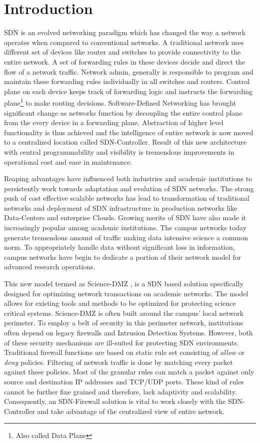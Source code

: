\section{Introduction}

SDN is an evolved networking paradigm which has changed the way a network operates when compared to conventional networks. A traditional network uses different set of devices like router and switches to provide connectivity to the entire network. A set of forwarding rules in these devices decide and direct the flow of a network traffic. Network admin, generally is responsible to program and maintain these forwarding 
rules individually in all switches and routers. Control plane on each device
keeps track of forwarding logic and instructs the forwarding plane\footnote
{Also called Data Plane} to make routing decisions. 
Software-Defined Networking has brought significant change as networks function by
decoupling the entire control plane from the every device in a forwarding plane. Abstraction of higher level functionality is thus achieved and the intelligence of entire 
network  is now moved to a centralized location called SDN-Controller. 
Result of this new architecture with central programmability and visibility is tremendous improvements in operational cost and ease in maintenance.

Reaping advantages have influenced both industries and academic institutions to  persistently work towards adaptation and evolution of SDN networks. The strong push of cost effective scalable networks has lead to transformation of traditional networks and deployment of SDN infrastructure in production networks like Data-Centers and enterprise Clouds. Growing merits of SDN have also made it increasingly popular among academic institutions. The campus networks today generate tremendous amount of traffic making data intensive science a common norm.
To appropriately handle data without significant loss in information, campus networks have begin to dedicate a portion of their network model for advanced research operations.

This new model termed as Science-DMZ \cite{SCIENCEDMZ}, is a SDN based solution specifically designed for optimizing network transactions on academic networks. The model allows for existing tools and methods to be optimized for protecting science critical systems.
Science-DMZ is often built around the campus' local network perimeter. To employ a belt of security in this perimeter network, institutions often depend on legacy firewalls and Intrusion Detection Systems. However, both of these security mechanisms are ill-suited for protecting SDN environments. Traditional firewall functions are based on static rule set consisting of \textit{allow} or \textit{deny} policies. Filtering
of network traffic is done by matching every packet against these policies. Most of the granular rules can match a packet against only source and destination IP addresses and TCP/UDP ports. These kind of rules cannot be further fine grained and therefore, lack adaptivity and scalability. Consequently, an SDN-Firewall solution is vital to work closely with the SDN-Controller and take advantage of the centralized view of entire network.

